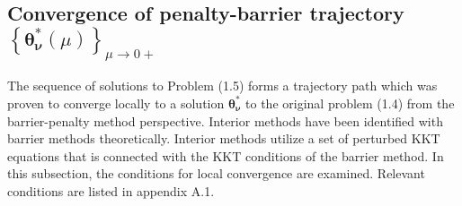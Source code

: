 \documentclass[12pt]{article}
\newcommand{\bs}{ \boldsymbol}
\newcommand{\lt}{\left}
\newcommand{\rt}{\right}
\begin{document}
\subsection{Convergence of penalty-barrier trajectory $\lt\{ \bs{\theta}_{\bs{\nu}}^*(\mu)\rt\}_{\mu \to 0+}$}
The sequence of solutions to Problem (1.5) forms a trajectory path which was proven to converge locally to a solution $\bs{\theta}_{\bs{\nu}}^*$ to the original problem (1.4) from the barrier-penalty method perspective. Interior methods have been identified with barrier methods theoretically. Interior methods utilize a set of perturbed KKT equations that is connected with the KKT conditions of the barrier method. In this subsection, the conditions for local convergence are examined. Relevant conditions are listed in appendix A.1. \\
\end{document}
